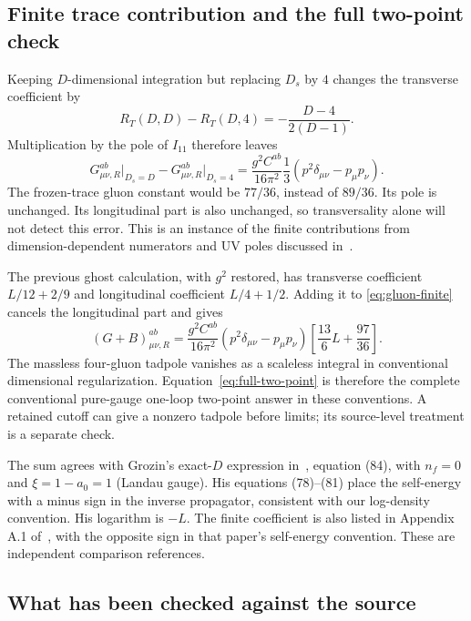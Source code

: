 \documentclass[11pt]{article}
\begin{document}
\subsection{Finite trace contribution and the full two-point check}

Keeping $D$-dimensional integration but replacing $D_s$ by $4$ changes
the transverse coefficient by
\[
 R_T(D,D)-R_T(D,4)=-\frac{D-4}{2(D-1)}.
\]
Multiplication by the pole of $I_{11}$ therefore leaves
\begin{equation}\label{eq:gluon-extra-finite}
 \boxed{G^{ab}_{\mu\nu,R}\big|_{D_s=D}
       -G^{ab}_{\mu\nu,R}\big|_{D_s=4}
 =\frac{g^2C^{ab}}{16\pi^2}\frac13
 (p^2\delta_{\mu\nu}-p_\mu p_\nu).}
\end{equation}
The frozen-trace gluon constant would be $77/36$, instead of $89/36$.
Its pole is unchanged. Its longitudinal part is also unchanged, so
transversality alone will not detect this error. This is an instance of
the finite contributions from dimension-dependent numerators and UV
poles discussed in~\cite{rational}.

The previous ghost calculation, with $g^2$ restored, has transverse
coefficient $L/12+2/9$ and longitudinal coefficient $L/4+1/2$.
Adding it to \eqref{eq:gluon-finite} cancels the longitudinal part and gives
\begin{equation}\label{eq:full-two-point}
 (G+B)^{ab}_{\mu\nu,R}
 =\frac{g^2C^{ab}}{16\pi^2}
 (p^2\delta_{\mu\nu}-p_\mu p_\nu)
 \left[\frac{13}{6}L+\frac{97}{36}\right].
\end{equation}
The massless four-gluon tadpole vanishes as a scaleless integral in
conventional dimensional regularization. Equation~\eqref{eq:full-two-point}
is therefore the complete conventional pure-gauge one-loop two-point
answer in these conventions. A retained cutoff can give a nonzero
tadpole before limits; its source-level treatment is a separate check.

The sum agrees with Grozin's exact-$D$ expression in~\cite{grozin},
equation (84), with $n_f=0$ and $\xi=1-a_0=1$ (Landau gauge).
His equations (78)--(81) place the self-energy with a minus sign in
the inverse propagator, consistent with our log-density convention.
His logarithm is $-L$. The finite coefficient is also listed in
Appendix A.1 of~\cite{ruijl}, with the opposite sign in that paper's
self-energy convention. These are independent comparison references.

\subsection{What has been checked against the source}
\end{document}
